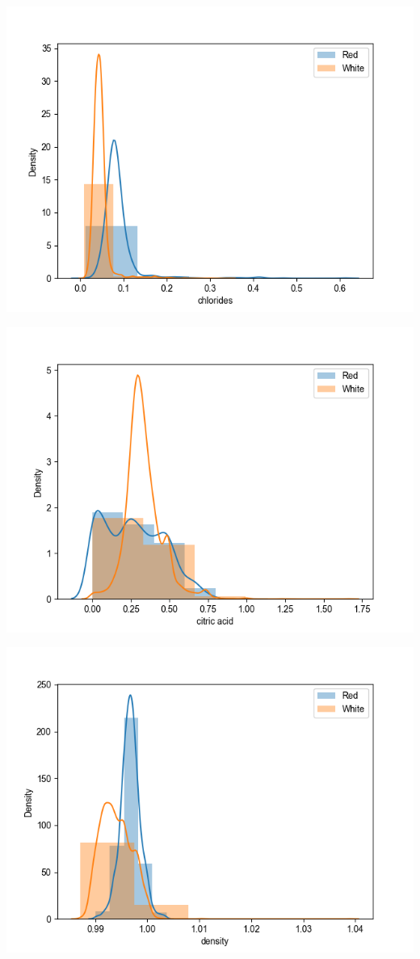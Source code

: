 \documentclass[12pt, letterpaper]{article}
\begin{document}
\includegraphics[scale=\myscale]{class_dist_chlorides.png}

\includegraphics[scale=\myscale]{class_dist_citric_acid.png}

\includegraphics[scale=\myscale]{class_dist_density.png}
\end{document}
